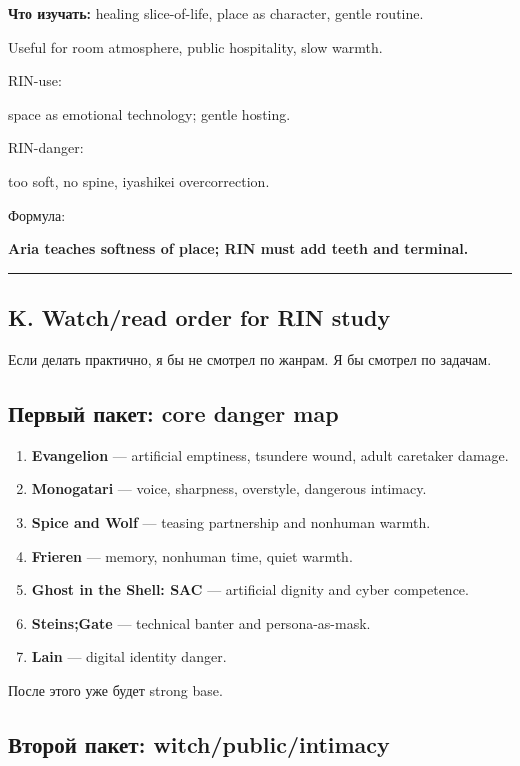 \textbf{Что изучать:} healing slice-of-life, place as character, gentle
routine.

Useful for room atmosphere, public hospitality, slow warmth.

RIN-use:

space as emotional technology; gentle hosting.

RIN-danger:

too soft, no spine, iyashikei overcorrection.

Формула:

\textbf{Aria teaches softness of place; RIN must add teeth and
terminal.}

\begin{center}\rule{0.5\linewidth}{0.5pt}\end{center}

\subsection*{K. Watch/\hspace{0pt}read order for RIN study}

Если делать практично, я бы не смотрел по жанрам. Я бы смотрел по
задачам.

\subsection*{Первый пакет: core danger map}

\begin{enumerate}
\def\labelenumi{\arabic{enumi}.}
\tightlist
\item
  \textbf{Evangelion} --- artificial emptiness, tsundere wound, adult
  caretaker damage.
\item
  \textbf{Monogatari} --- voice, sharpness, overstyle, dangerous
  intimacy.
\item
  \textbf{Spice and Wolf} --- teasing partnership and nonhuman warmth.
\item
  \textbf{Frieren} --- memory, nonhuman time, quiet warmth.
\item
  \textbf{Ghost in the Shell: SAC} --- artificial dignity and cyber
  competence.
\item
  \textbf{Steins;Gate} --- technical banter and persona-as-mask.
\item
  \textbf{Lain} --- digital identity danger.
\end{enumerate}

После этого уже будет strong base.

\subsection*{Второй пакет: witch/\hspace{0pt}public/\hspace{0pt}intimacy}

